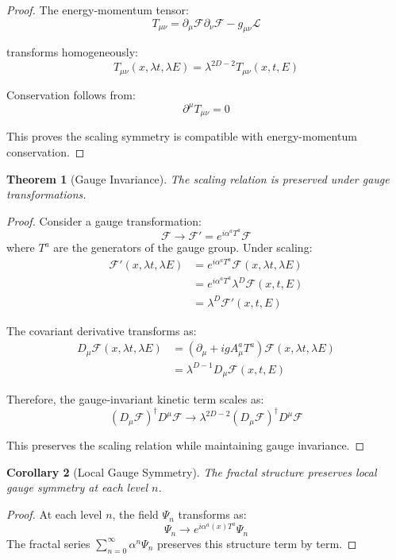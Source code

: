 \documentclass[12pt]{article}
\newtheorem{theorem}{Theorem}[section]
\newtheorem{corollary}[theorem]{Corollary}
\begin{document}
\begin{proof}
The energy-momentum tensor:
\[
T_{\mu\nu} = \partial_\mu\mathcal{F}\partial_\nu\mathcal{F} - g_{\mu\nu}\mathcal{L}
\]

transforms homogeneously:
\[
T_{\mu\nu}(x, \lambda t, \lambda E) = \lambda^{2D-2}T_{\mu\nu}(x, t, E)
\]

Conservation follows from:
\[
\partial^\mu T_{\mu\nu} = 0
\]

This proves the scaling symmetry is compatible with energy-momentum conservation.
\end{proof}

\begin{theorem}[Gauge Invariance]
The scaling relation is preserved under gauge transformations.
\end{theorem}

\begin{proof}
Consider a gauge transformation:
\[
\mathcal{F} \to \mathcal{F}' = e^{i\alpha^a T^a} \mathcal{F}
\]
where $T^a$ are the generators of the gauge group. Under scaling:
\begin{align*}
\mathcal{F}'(x, \lambda t, \lambda E) &= e^{i\alpha^a T^a} \mathcal{F}(x, \lambda t, \lambda E) \\
&= e^{i\alpha^a T^a} \lambda^D \mathcal{F}(x, t, E) \\
&= \lambda^D \mathcal{F}'(x, t, E)
\end{align*}

The covariant derivative transforms as:
\begin{align*}
D_\mu \mathcal{F}(x, \lambda t, \lambda E) &= (\partial_\mu + igA_\mu^a T^a)\mathcal{F}(x, \lambda t, \lambda E) \\
&= \lambda^{D-1} D_\mu \mathcal{F}(x, t, E)
\end{align*}

Therefore, the gauge-invariant kinetic term scales as:
\[
(D_\mu \mathcal{F})^\dagger D^\mu \mathcal{F} \to \lambda^{2D-2} (D_\mu \mathcal{F})^\dagger D^\mu \mathcal{F}
\]

This preserves the scaling relation while maintaining gauge invariance.
\end{proof}

\begin{corollary}[Local Gauge Symmetry]
The fractal structure preserves local gauge symmetry at each level $n$.
\end{corollary}

\begin{proof}
At each level $n$, the field $\Psi_n$ transforms as:
\[
\Psi_n \to e^{i\alpha^a(x) T^a} \Psi_n
\]
The fractal series $\sum_{n=0}^{\infty} \alpha^n \Psi_n$ preserves this structure term by term.
\end{proof}
\end{document}
